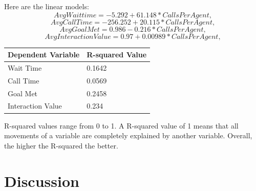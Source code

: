 \documentclass[12pt]{article}
\begin{document}
  Here are the linear models:
  \begin{equation}
    \label{eq:Wait Time}
  AvgWaittime= -5.292 + 61.148*CallsPerAgent,
  \end{equation}
  \begin{equation}
    \label{eq:Call Time}
  AvgCallTime = -256.252 + 20.115*CallsPerAgent,
  \end{equation}
  \begin{equation}
    \label{eq:Goal Met}
  AvgGoalMet= 0.986 - 0.216*CallsPerAgent,
  \end{equation}
  \begin{equation}
    \label{eq:InteractionValue}
  AvgInteractionValue= 0.97 + 0.00989*CallsPerAgent,
  \end{equation}

  \begin{table}[H]
    \resizebox{\textwidth}{!} {
    \begin{tabular}{ l | l |}
      {\bf Dependent Variable} & {\bf R-squared Value}\\
    \hline
    Wait Time& 0.1642 \\
    \hline
    Call Time& 0.0569\\
    \hline
    Goal Met& 0.2458\\
    \hline
    Interaction Value& 0.234\\
    \end{tabular}
    }
    \end{table}
R-squared values range from 0 to 1. A R-squared value of 1 means that all movements of a variable are completely explained by another variable. 
Overall, the higher the R-squared the better.
\section*{Discussion}




\end{document}
